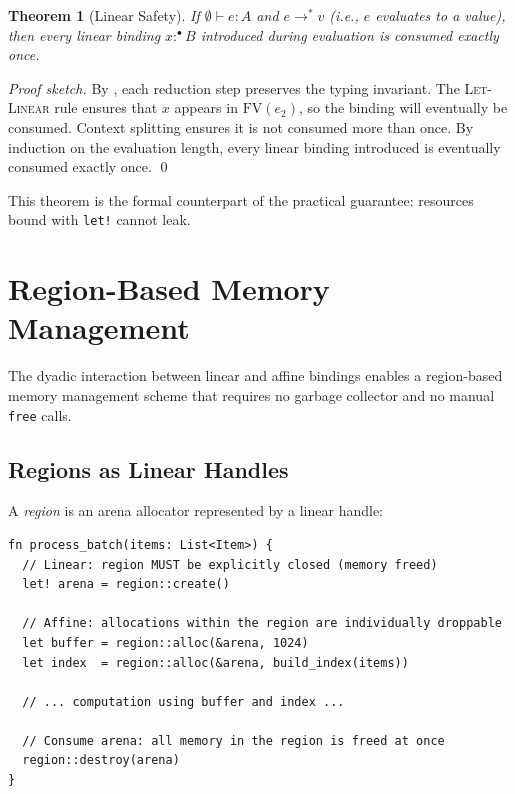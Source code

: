 \documentclass[11pt,a4paper]{article}
\newtheorem{theorem}{Theorem}[section]
\newcommand{\lmark}{\bullet}  %
\newcommand{\judge}[3]{#1 \vdash #2 : #3}
\begin{document}
\begin{theorem}[Linear Safety]
\label{thm:linear-safety}
If $\judge{\emptyset}{e}{A}$ and $e \longrightarrow^* v$ (i.e., $e$ evaluates
to a value), then every linear binding $x :^\lmark B$ introduced during
evaluation is consumed exactly once.
\end{theorem}

\begin{proof}[Proof sketch]
By , each reduction step preserves the typing invariant.
The \textsc{Let-Linear} rule ensures that $x$ appears in $\text{FV}(e_2)$, so
the binding will eventually be consumed. Context splitting ensures it is not
consumed more than once. By induction on the evaluation length, every linear
binding introduced is eventually consumed exactly once. \qed
\end{proof}

This theorem is the formal counterpart of the practical guarantee: resources
bound with \lstinline{let!} cannot leak.

\section{Region-Based Memory Management}
\label{sec:regions}

The dyadic interaction between linear and affine bindings enables a
region-based memory management scheme that requires no garbage collector and
no manual \lstinline{free} calls.

\subsection{Regions as Linear Handles}

A \emph{region} is an arena allocator represented by a linear handle:

\begin{lstlisting}[language=Ephapax, caption={Region-based allocation.}]
fn process_batch(items: List<Item>) {
  // Linear: region MUST be explicitly closed (memory freed)
  let! arena = region::create()

  // Affine: allocations within the region are individually droppable
  let buffer = region::alloc(&arena, 1024)
  let index  = region::alloc(&arena, build_index(items))

  // ... computation using buffer and index ...

  // Consume arena: all memory in the region is freed at once
  region::destroy(arena)
}
\end{lstlisting}
\end{document}
